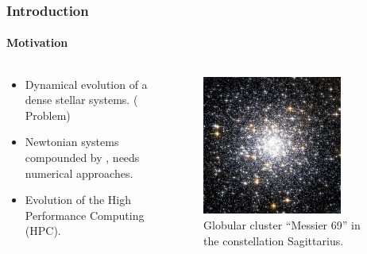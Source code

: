 \begin{frame}
    \frametitle{Introduction}
    \framesubtitle{Motivation}

    \begin{columns}
        \begin{column}{0.6\textwidth}
            \begin{itemize}
                \item Dynamical evolution of a dense stellar systems.
                      ({\nbody} Problem)
                \item Newtonian systems compounded by ,
                      needs numerical approaches.
                \item Evolution of the High Performance Computing (HPC).
            \end{itemize}
        \end{column}
        \begin{column}{0.4\textwidth}
            \begin{figure}
                \centering
                \includegraphics[width=0.8\textwidth]{img/m69}
                \caption{Globular cluster ``Messier 69'' in the constellation Sagittarius.}
                \label{fig:m69}
            \end{figure}
        \end{column}
    \end{columns}

\end{frame}

